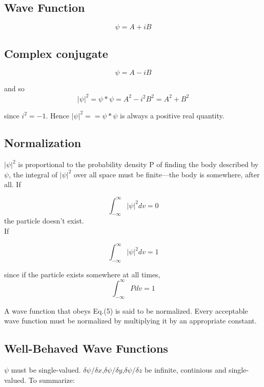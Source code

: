 \documentclass{article}
\begin{document}
\subsection*{Wave Function}

\begin{equation}
    \psi=A+iB
\end{equation}

\subsection*{Complex conjugate}

\begin{equation}
    \psi=A-iB
\end{equation}

and so \begin{equation}
    |\psi|^2=\psi*\psi=A^2-i^2B^2=A^2+B^2
\end{equation}

since $i^2=-1$. Hence $|\psi|^2==\psi*\psi$ is always a positive real quantity.

\subsection*{Normalization}

$|\psi|^2$ is proportional to the probability density P of finding the body described by $\psi$, the integral of $|\psi|^2$ over all space must be finite—the body is somewhere, after all. If

\begin{equation}
    \int_{-\infty}^{\infty}|\psi|^2dv=0
\end{equation}
the particle doesn't exist.
\vspace{10pt}
\\
If

\begin{equation}
    \int_{-\infty}^{\infty}|\psi|^2dv=1
\end{equation}

since if the particle exists somewhere at all times,
\begin{equation}
    \int_{-\infty}^{\infty}Pdv=1
\end{equation}

A wave function that obeys Eq.(5) is said to be normalized. Every acceptable wave function must be normalized by multiplying it by an appropriate constant.

\subsection*{Well-Behaved Wave Functions}
$\psi$ must be single-valued. $\delta\psi/\delta x$,$\delta\psi/\delta y$,$\delta\psi/\delta z$ be infinite, continious and single-valued. To summarize:
\end{document}
